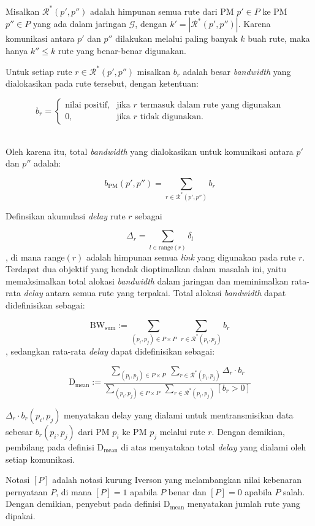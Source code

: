 Misalkan $\mathcal{R}^*(p',p'')$ adalah himpunan semua rute dari PM $p' \in P$ ke PM $p'' \in P$ yang ada dalam jaringan $\mathcal{G}$, dengan $k' = |\mathcal{R}^*(p',p'')|$. Karena komunikasi antara $p'$ dan $p''$ dilakukan melalui paling banyak $k$ buah rute, maka hanya $k'' \leq k$ rute yang benar-benar digunakan.  

Untuk setiap rute $r \in \mathcal{R}^*(p',p'')$ misalkan $b_r$ adalah besar \textit{bandwidth} yang dialokasikan pada rute tersebut, dengan ketentuan:

\begin{equation*}
  b_r = 
  \begin{cases} 
    \text{nilai positif}, & \text{jika } r \text{ termasuk dalam rute yang digunakan} \\
     0, & \text{jika } r \text{ tidak digunakan}. 
  \end{cases}
\end{equation*}​

Oleh karena itu, total \textit{bandwidth} yang dialokasikan untuk komunikasi antara $p'$ dan $p''$ adalah: 

\begin{equation*}
  b_\text{PM}(p',p'')=\sum_{r \in \mathcal{R}^*(p',p'')} b_{r}
\end{equation*}

Definsikan akumulasi \textit{delay} rute $r$ sebagai

\begin{equation*}
  \Delta_r = \sum_{l \in \text{range}(r)}\delta_l
\end{equation*}
, di mana $\text{range}(r)$ adalah himpunan semua \textit{link} yang digunakan pada rute $r$.
Terdapat dua objektif yang hendak dioptimalkan dalam masalah ini, yaitu memaksimalkan total alokasi \textit{bandwidth} dalam jaringan dan meminimalkan rata-rata \textit{delay} antara semua rute yang terpakai. Total alokasi \textit{bandwidth} dapat didefinisikan sebagai:

\begin{equation*}
\text{BW}_\text{sum}:=\displaystyle \sum_{(p_i,p_j) \in P\times P} \ \sum_{r\in\mathcal{R}^*(p_i,p_j)} b_r
\end{equation*}
, sedangkan rata-rata \textit{delay} dapat didefinisikan sebagai:

\begin{equation*}
\text{D}_\text{mean}:=\frac{\displaystyle \sum_{(p_i,p_j) \in P \times P} \ \sum_{r\in\mathcal{R}^*(p_i,p_j)} \Delta_r\cdot b_r}{\displaystyle \sum_{(p_i,p_j) \in P \times P}\ \sum_{r\in\mathcal{R}^*(p_i,p_j)}[b_r>0]}
\end{equation*}

$\Delta_r\cdot b_r(p_i,p_j)$ menyatakan delay yang dialami untuk mentransmisikan data sebesar $b_r(p_i,p_j)$ dari PM $p_i$ ke PM $p_j$ melalui rute $r$. Dengan demikian, pembilang pada definisi $\text{D}_\text{mean}$ di atas menyatakan total \textit{delay} yang dialami oleh setiap komunikasi. 

Notasi $[P]$ adalah notasi kurung Iverson yang melambangkan nilai kebenaran pernyataan $P$, di mana $[P]=1$ apabila $P$ benar dan $[P]=0$ apabila $P$ salah. Dengan demikian, penyebut pada definisi $\text{D}_\text{mean}$ menyatakan jumlah rute yang dipakai. 
